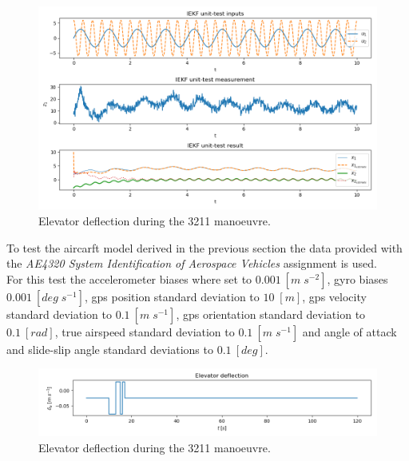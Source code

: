 \begin{figure}
    \centering
    \includegraphics[width=14cm]{figures/iekf_test}
    \caption{Elevator deflection during the 3211 manoeuvre.}
    \label{fig:iekf_test}
\end{figure}


To test the aircarft model derived in the previous section the data provided with the \textit{AE4320 System Identification of Aerospace Vehicles} assignment is used.\\

For this test the accelerometer biases where set to $0.001~[m\;s^{-2}]$, gyro biases $0.001~[deg\;s^{-1}]$, gps position standard deviation to $10\;[m]$, gps velocity standard deviation to $0.1~[m\;s^{-1}]$, gps orientation standard deviation to $0.1~[rad]$, true airspeed standard deviation to $0.1~[m\;s^{-1}]$ and angle of attack and slide-slip angle standard deviations to $0.1~[deg]$.\\


\begin{figure}
    \centering
    \includegraphics[width=14cm]{figures/iekf_de}
    \caption{Elevator deflection during the 3211 manoeuvre.}
    \label{fig:iekf_de}
\end{figure}

